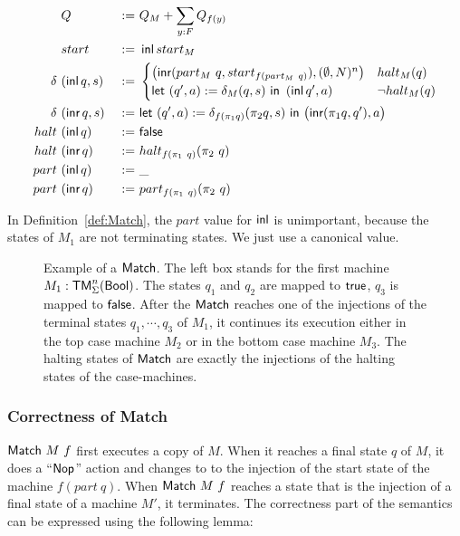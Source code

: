 \begin{definition}[$\MS{Match}~M~f$]
  \label{def:Match}
  \begin{alignat*}{3}
    & Q                  &~:=~& Q_M +  \sum_{y:F} Q_{f(y)} \\
    & start              &~:=~& \operatorname{\textsf{inl}} start_M \\
    \delta ~&(\operatorname{\textsf{inl}} q, s) &~:=~&
    \begin{cases}
      \bigl(\operatorname{\textsf{inr}} (part_M~q, start_{f (part_M~q)}), (\emptyset, N)^n \bigr) & halt_M(q) \\
      \textsf{let}~(q', a) := \delta_M(q, s)~\textsf{in}~\left(\operatorname{\textsf{inl}} q', a \right) & \lnot halt_M(q)
    \end{cases} \\
    \delta ~&(\operatorname{\textsf{inr}} q, s) &~:=~& \textsf{let}~(q', a) := \delta_{f(\pi_1 q)} (\pi_2 q, s)~\textsf{in}~\bigl( \operatorname{\textsf{inr}} (\pi_1 q, q'), a \bigr) \\
    halt   ~&(\operatorname{\textsf{inl}}  q)   &~:=~& \textsf{false} \\
    halt   ~&(\operatorname{\textsf{inr}}  q)   &~:=~& halt_{f(\pi_1~q)} (\pi_2~q) \\
    part   ~&(\operatorname{\textsf{inl}}  q)   &~:=~& \_ \\
    part   ~&(\operatorname{\textsf{inr}}  q)   &~:=~& part_{f(\pi_1~q)} (\pi_2~q)
  \end{alignat*}
\end{definition}

In Definition~\ref{def:Match}, the $part$ value for $\operatorname{\textsf{inl}}$ is unimportant, because the states of $M_1$ are not terminating states.  We just use a
canonical value.

\begin{figure}
  \center
  
  \caption{Example of a $\textsf{Match}$.  The left box stands for the first machine $M_1:\textsf{TM}_\Sigma^n(\textsf{Bool})$.  The states $q_1$ and $q_2$ are mapped to
    $\textsf{true}$, $q_3$ is mapped to $\textsf{false}$.  After the $\textsf{Match}$ reaches one of the injections of the terminal states $q_1, \cdots, q_3$ of $M_1$, it
    continues its execution either in the top case machine $M_2$ or in the bottom case machine $M_3$.  The halting states of $\textsf{Match}$ are exactly
    the injections of the halting states of the case-machines.}
  \label{fig:match}
\end{figure}

\subsubsection{Correctness of Match}
\label{sec:Match-correct}


$\MS{Match}~M~f$ first executes a copy of $M$.  When it reaches a final state $q$ of $M$, it does a ``$\textsf{Nop}$'' action and changes to to the
injection of the start state of the machine $f(part~q)$.  When $\MS{Match}~M~f$ reaches a state that is the injection of a final state of a machine
$M'$, it terminates.  The correctness part of the semantics can be expressed using the following lemma:


